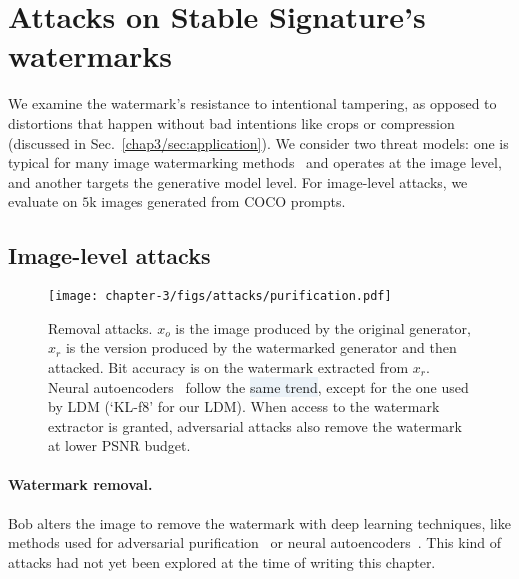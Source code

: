 \section{Attacks on Stable Signature's watermarks}\label{chap3/sec:attacks}

We examine the watermark's resistance to intentional tampering, 
as opposed to distortions that happen without bad intentions like crops or compression (discussed in Sec.~\ref{chap3/sec:application}). 
We consider two threat models: one  is typical for many image watermarking methods~\citep{cox2007digital} and operates at the image level, and another targets the generative model level. 
For image-level attacks, we evaluate on $5$k images generated from COCO prompts.





\subsection{Image-level attacks}\label{chap3/subsec:image-level-attacks}

\begin{figure}[b!]
    \centering
    \texttt{[image: chapter-3/figs/attacks/purification.pdf]}
    \caption{Removal attacks.
    $x_o$ is the image produced by the original generator, 
    $x_r$ is the version produced by the watermarked generator and then attacked.
    Bit accuracy is on the watermark extracted from $x_r$.
    Neural autoencoders~\citep{balle2018variational, cheng2020learned, esser2021taming} follow the \colorbox[HTML]{ebf2f8}{same trend}, except for the one used by LDM (`KL-f8' for our LDM).
    When access to the watermark extractor is granted, adversarial attacks also remove the watermark at lower PSNR budget.
    }
    \label{chap3/fig:purification}
\end{figure}

\paragraph{Watermark removal.}
Bob alters the image to remove the watermark with deep learning techniques, like methods used for adversarial purification~\citep{shi2021online, yoon2021adversarial} or neural autoencoders~\citep{abdelnabi2021adversarial, liu2020defending}.
This kind of attacks had not yet been explored at the time of writing this chapter.

